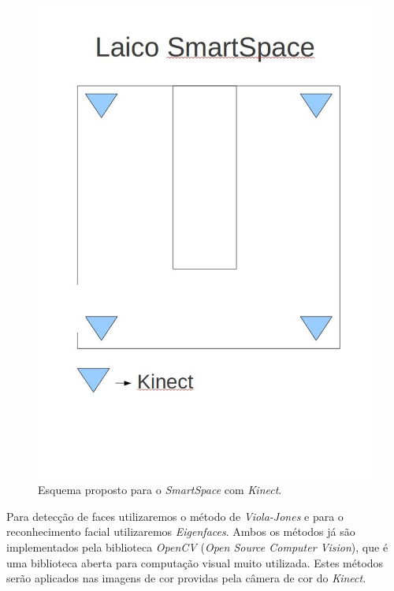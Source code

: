 	\begin{figure}[hbt]
		\begin{center}
			\includegraphics[scale=0.3]{figuras/4.ProblemaEProposta/esquemaSmartSpaceProposto.jpg}
		\end{center}
		\caption{Esquema proposto para o \textit{SmartSpace} com \textit{Kinect}.}
		\label{smartSpaceProposto}
	\end{figure}

	Para detecção de faces utilizaremos o método de \textit{Viola-Jones} e para o reconhecimento facial utilizaremos \textit{Eigenfaces}. Ambos os métodos já são implementados pela biblioteca \textit{OpenCV} (\textit{Open Source Computer Vision}), que é uma biblioteca aberta para computação visual muito utilizada. Estes métodos serão aplicados nas imagens de cor providas pela câmera de cor do \textit{Kinect}.

